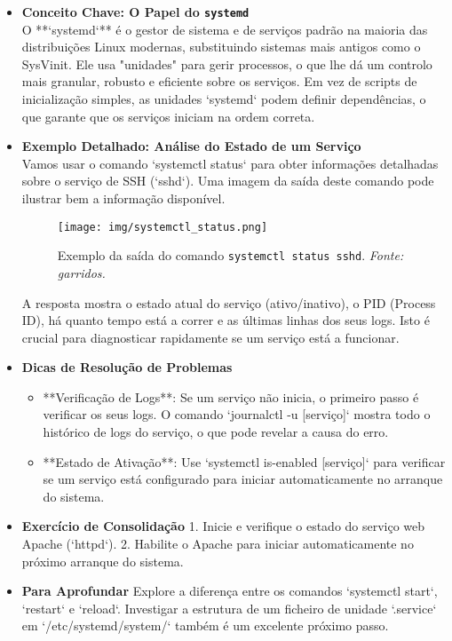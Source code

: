 \documentclass[10pt,a4paper]{article}
\begin{document}
	\begin{itemize}
		\item \textbf{Conceito Chave: O Papel do \texttt{systemd}} \\
		O **`systemd`** é o gestor de sistema e de serviços padrão na maioria das distribuições Linux modernas, substituindo sistemas mais antigos como o SysVinit. Ele usa "unidades" para gerir processos, o que lhe dá um controlo mais granular, robusto e eficiente sobre os serviços. Em vez de scripts de inicialização simples, as unidades `systemd` podem definir dependências, o que garante que os serviços iniciam na ordem correta.
		
		\item \textbf{Exemplo Detalhado: Análise do Estado de um Serviço} \\
		Vamos usar o comando `systemctl status` para obter informações detalhadas sobre o serviço de SSH (`sshd`). Uma imagem da saída deste comando pode ilustrar bem a informação disponível.
		
		\begin{figure}[h]
			\centering
			\texttt{[image: img/systemctl\_status.png]}
			\caption{Exemplo da saída do comando \texttt{systemctl status sshd}. \textit{Fonte: garridos.}}
			\label{fig:systemctl_status}
		\end{figure}
		
		A resposta mostra o estado atual do serviço (ativo/inativo), o PID (Process ID), há quanto tempo está a correr e as últimas linhas dos seus logs. Isto é crucial para diagnosticar rapidamente se um serviço está a funcionar.
		
		\item \textbf{Dicas de Resolução de Problemas}
		\begin{itemize}
			\item **Verificação de Logs**: Se um serviço não inicia, o primeiro passo é verificar os seus logs. O comando `journalctl -u [serviço]` mostra todo o histórico de logs do serviço, o que pode revelar a causa do erro.
			\item **Estado de Ativação**: Use `systemctl is-enabled [serviço]` para verificar se um serviço está configurado para iniciar automaticamente no arranque do sistema.
		\end{itemize}
		
		\item \textbf{Exercício de Consolidação}
		1. Inicie e verifique o estado do serviço web Apache (`httpd`).
		2. Habilite o Apache para iniciar automaticamente no próximo arranque do sistema.
		
		\item \textbf{Para Aprofundar}
		Explore a diferença entre os comandos `systemctl start`, `restart` e `reload`. Investigar a estrutura de um ficheiro de unidade `.service` em `/etc/systemd/system/` também é um excelente próximo passo.
	\end{itemize}
	
\end{document}
